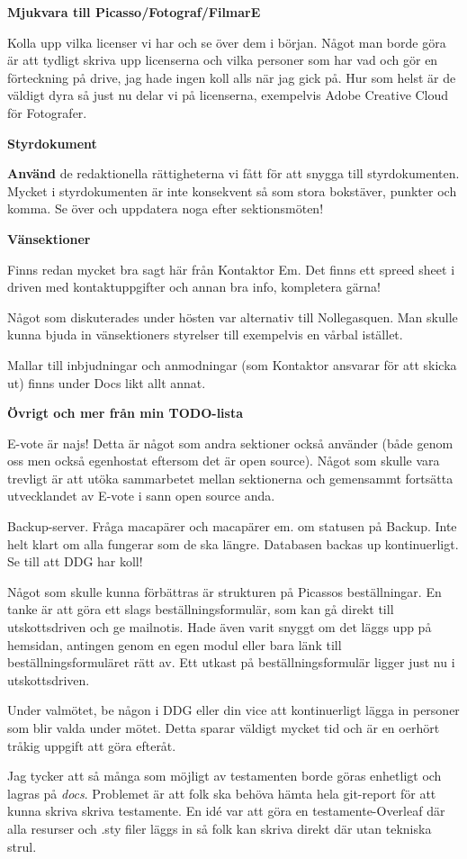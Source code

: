 \documentclass[10pt]{article}
\begin{document}
{\large \textbf{Mjukvara till Picasso/Fotograf/FilmarE}}

Kolla upp vilka licenser vi har och se över dem i början. Något man borde göra är att tydligt skriva upp licenserna och vilka personer som har vad och gör en förteckning på drive, jag hade ingen koll alls när jag gick på. Hur som helst är de väldigt dyra så just nu delar vi på licenserna, exempelvis Adobe Creative Cloud för Fotografer.

{\large \textbf{Styrdokument}}

\textbf{Använd} de redaktionella rättigheterna vi fått för att snygga till styrdokumenten. Mycket i styrdokumenten är inte konsekvent så som stora bokstäver, punkter och komma. Se över och uppdatera noga efter sektionsmöten!

{\large \textbf{Vänsektioner}}

Finns redan mycket bra sagt här från Kontaktor Em. Det finns ett spreed sheet i driven med kontaktuppgifter och annan bra info, kompletera gärna!

Något som diskuterades under hösten var alternativ till Nollegasquen. Man skulle kunna bjuda in vänsektioners styrelser till exempelvis en vårbal istället. 

Mallar till inbjudningar och anmodningar (som Kontaktor ansvarar för att skicka ut) finns under Docs likt allt annat.  


{\large \textbf{Övrigt och mer från min TODO-lista}}

\begin{dashlist}
    \item E-vote är najs! Detta är något som andra sektioner också använder (både genom oss men också egenhostat eftersom det är open source). Något som skulle vara trevligt är att utöka sammarbetet mellan sektionerna och gemensammt fortsätta utvecklandet av E-vote i sann open source anda.
    \item Backup-server. Fråga macapärer och macapärer em. om statusen på Backup. Inte helt klart om alla fungerar som de ska längre. Databasen backas up kontinuerligt. Se till att DDG har koll!
    \item Något som skulle kunna förbättras är strukturen på Picassos beställningar. En tanke är att göra ett slags beställningsformulär, som kan gå direkt till utskottsdriven och ge mailnotis. Hade även varit snyggt om det läggs upp på hemsidan, antingen genom en egen modul eller bara länk till beställningsformuläret rätt av. Ett utkast på beställningsformulär ligger just nu i utskottsdriven. 
    \item Under valmötet, be någon i DDG eller din vice att kontinuerligt lägga in personer som blir valda under mötet. Detta sparar väldigt mycket tid och är en oerhört tråkig uppgift att göra efteråt. 
    \item Jag tycker att så många som möjligt av testamenten borde göras enhetligt och lagras på \textit{docs}. Problemet är att folk ska behöva hämta hela git-report för att kunna skriva skriva testamente. En idé var att göra en testamente-Overleaf där alla resurser och .sty filer läggs in så folk kan skriva direkt där utan tekniska strul.
\end{dashlist}
\end{document}
